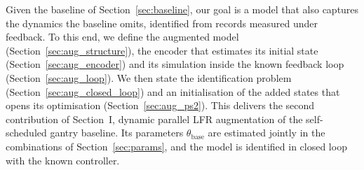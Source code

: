 Given the baseline of Section~\ref{sec:baseline}, our goal is a model that
also captures the dynamics the baseline omits, identified from records
measured under feedback.
To this end, we define the augmented model (Section~\ref{sec:aug_structure}),
the encoder that estimates its initial state (Section~\ref{sec:aug_encoder})
and its simulation inside the known feedback loop
(Section~\ref{sec:aug_loop}).
We then state the identification problem
(Section~\ref{sec:aug_closed_loop}) and an initialisation of the added states
that opens its optimisation (Section~\ref{sec:aug_ps2}).
This delivers the second contribution of Section~I, dynamic parallel LFR
augmentation of the self-scheduled gantry baseline.
Its parameters $\theta_{\mathrm{base}}$ are estimated jointly in the
combinations of Section~\ref{sec:params}, and the model is identified in
closed loop with the known controller.


